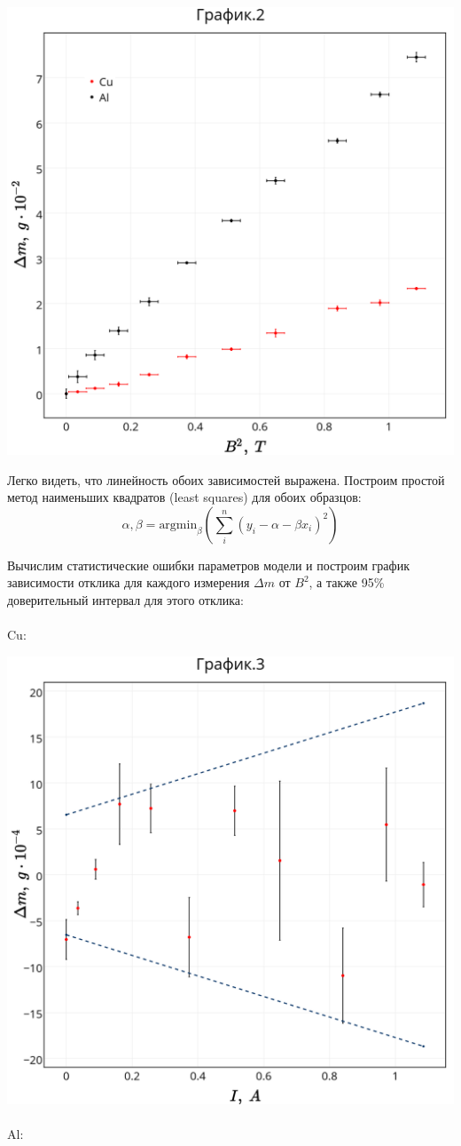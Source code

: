 \includegraphics[scale = 0.19]{my_plot2.png} 

Легко видеть, что линейность обоих зависимостей выражена. Построим простой метод наименьших квадратов (least squares) для обоих образцов:
$$ \alpha, \beta = \text{argmin}_{\beta}(\sum_i^n (y_i - \alpha - \beta x_i)^2) $$

Вычислим статистические ошибки параметров модели и построим график зависимости отклика для каждого измерения $\Delta{m}$ от $B^2$, а также 95\% доверительный интервал для этого отклика:\\
\\
Cu:

\includegraphics[scale = 0.19]{my_plot3.png}\\
\\
Al:


